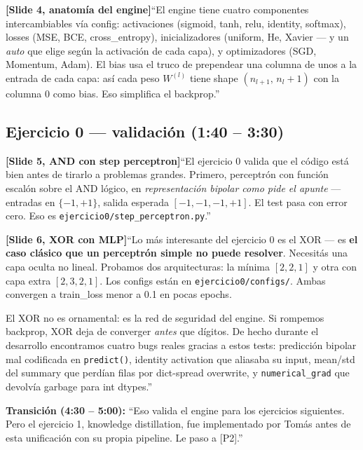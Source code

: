 \documentclass[11pt,a4paper]{article}
\newcommand{\code}[1]{\texttt{\textcolor{accent}{#1}}}
\newcommand{\file}[1]{\texttt{\small #1}}
\newcommand{\slidenum}[1]{\textcolor{accent}{\textbf{[Slide #1]}}}
\newcommand{\timing}[1]{\textcolor{muted}{\small (#1)}}
\newcommand{\enunciado}[1]{\textcolor{warn}{\textit{#1}}}
\begin{document}
\slidenum{4, anatomía del engine}\quad ``El engine tiene cuatro componentes intercambiables vía config: activaciones (sigmoid, tanh, relu, identity, softmax), losses (MSE, BCE, cross\_entropy), inicializadores (uniform, He, Xavier --- y un \emph{auto} que elige según la activación de cada capa), y optimizadores (SGD, Momentum, Adam). El bias usa el truco de prependear una columna de unos a la entrada de cada capa: así cada peso $W^{(l)}$ tiene shape $(n_{l+1},\, n_l + 1)$ con la columna 0 como bias. Eso simplifica el backprop.''

\subsection{Ejercicio 0 --- validación \timing{1:40 -- 3:30}}

\slidenum{5, AND con step perceptron}\quad ``El ejercicio 0 valida que el código está bien antes de tirarlo a problemas grandes. Primero, perceptrón con función escalón sobre el AND lógico, en \enunciado{representación bipolar como pide el apunte} --- entradas en $\{-1, +1\}$, salida esperada $[-1, -1, -1, +1]$. El test pasa con error cero. Eso es \file{ejercicio0/step\_perceptron.py}.''

\slidenum{6, XOR con MLP}\quad ``Lo más interesante del ejercicio 0 es el XOR --- es \textbf{el caso clásico que un perceptrón simple no puede resolver}. Necesitás una capa oculta no lineal. Probamos dos arquitecturas: la mínima $[2, 2, 1]$ y otra con capa extra $[2, 3, 2, 1]$. Los configs están en \file{ejercicio0/configs/}. Ambas convergen a train\_loss menor a 0.1 en pocas epochs.

El XOR no es ornamental: es la red de seguridad del engine. Si rompemos backprop, XOR deja de converger \emph{antes} que dígitos. De hecho durante el desarrollo encontramos cuatro bugs reales gracias a estos tests: predicción bipolar mal codificada en \code{predict()}, identity activation que aliasaba su input, mean/std del summary que perdían filas por dict-spread overwrite, y \code{numerical\_grad} que devolvía garbage para int dtypes.''

\begin{cue}
\textbf{Transición \timing{4:30 -- 5:00}:} ``Eso valida el engine para los ejercicios siguientes. Pero el ejercicio 1, knowledge distillation, fue implementado por Tomás antes de esta unificación con su propia pipeline. Le paso a [P2].''
\end{cue}

\end{document}
